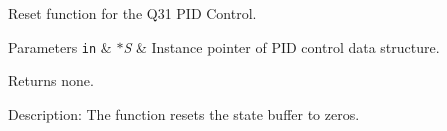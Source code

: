 Reset function for the Q31 P\-I\-D Control. 


\begin{DoxyParams}[1]{Parameters}
\mbox{\tt in}  & {\em $\ast$\-S} & Instance pointer of P\-I\-D control data structure. \\
\hline
\end{DoxyParams}
\begin{DoxyReturn}{Returns}
none. 
\end{DoxyReturn}
\begin{DoxyParagraph}{Description\-: }
The function resets the state buffer to zeros. 
\end{DoxyParagraph}
